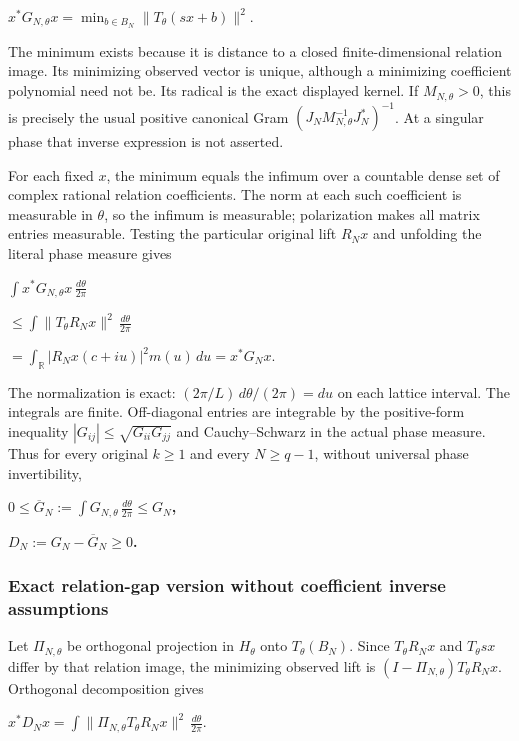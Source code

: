 \documentclass{article}
\begin{document}
\(x^*G_{N,\theta}x=\min_{b\in B_N}\|T_\theta(sx+b)\|^2\).

The minimum exists because it is distance to a closed finite-dimensional relation image. Its minimizing observed vector is unique, although a minimizing coefficient polynomial need not be. Its radical is the exact displayed kernel. If \(M_{N,\theta}>0\), this is precisely the usual positive canonical Gram \((J_NM_{N,\theta}^{-1}J_N^*)^{-1}\). At a singular phase that inverse expression is not asserted.

For each fixed \(x\), the minimum equals the infimum over a countable dense set of complex rational relation coefficients. The norm at each such coefficient is measurable in \(\theta\), so the infimum is measurable; polarization makes all matrix entries measurable. Testing the particular original lift \(R_Nx\) and unfolding the literal phase measure gives

\(\int x^*G_{N,\theta}x\,\frac{d\theta}{2\pi}\)

\(\le\int\|T_\theta R_Nx\|^2\,\frac{d\theta}{2\pi}\)

\(=\int_{\mathbb R}|R_Nx(c+iu)|^2m(u)\,du=x^*G_Nx\).

The normalization is exact: \((2\pi/L)\,d\theta/(2\pi)=du\) on each lattice interval. The integrals are finite. Off-diagonal entries are integrable by the positive-form inequality \(|G_{ij}|\le\sqrt{G_{ii}G_{jj}}\) and Cauchy--Schwarz in the actual phase measure. Thus for every original \(k\ge1\) and every \(N\ge q-1\), without universal phase invertibility,

\textbf{\(0\le\overline G_N:=\int G_{N,\theta}\,\frac{d\theta}{2\pi}\le G_N\),}

\textbf{\(D_N:=G_N-\overline G_N\ge0\).}

\subsubsection{Exact relation-gap version without coefficient inverse assumptions}\label{exact-relation-gap-version-without-coefficient-inverse-assumptions}

Let \(\Pi_{N,\theta}\) be orthogonal projection in \(H_\theta\) onto \(T_\theta(B_N)\). Since \(T_\theta R_Nx\) and \(T_\theta sx\) differ by that relation image, the minimizing observed lift is \((I-\Pi_{N,\theta})T_\theta R_Nx\). Orthogonal decomposition gives

\(x^*D_Nx=\int\|\Pi_{N,\theta}T_\theta R_Nx\|^2\,\frac{d\theta}{2\pi}\).
\end{document}
